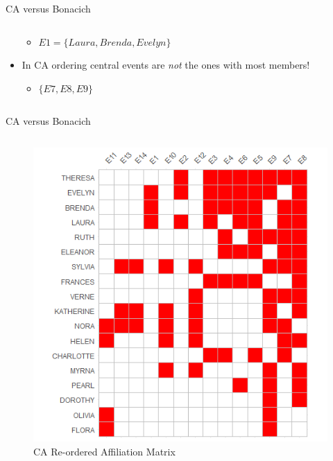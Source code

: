 \documentclass[
  ignorenonframetext,
]{beamer}
\providecommand{\tightlist}{%
  \setlength{\itemsep}{0pt}\setlength{\parskip}{0pt}}\usepackage{longtable,booktabs,array}
\begin{document}
\begin{frame}{CA versus Bonacich}
\begin{columns}[T]
\begin{column}{0.5\textwidth}
\begin{itemize}
  \begin{itemize}
  \tightlist
  \item
    \(E1 = \{Laura, Brenda, Evelyn\}\)
  \end{itemize}
\item
  In CA ordering central events are \emph{not} the ones with most
  members!

  \begin{itemize}
  \tightlist
  \item
    \(\{E7, E8, E9\}\)
  \end{itemize}
\end{itemize}
\end{column}
\end{columns}
\end{frame}

\begin{frame}{CA versus Bonacich}
\protect\hypertarget{ca-versus-bonacich-8}{}
\begin{columns}[T]
\begin{column}{0.5\textwidth}
\begin{figure}

{\centering \includegraphics{Plots/bon-reord.png}

}

\caption{CA Re-ordered Affiliation Matrix}

\end{figure}
\end{column}


\end{columns}
\end{frame}
\end{document}

